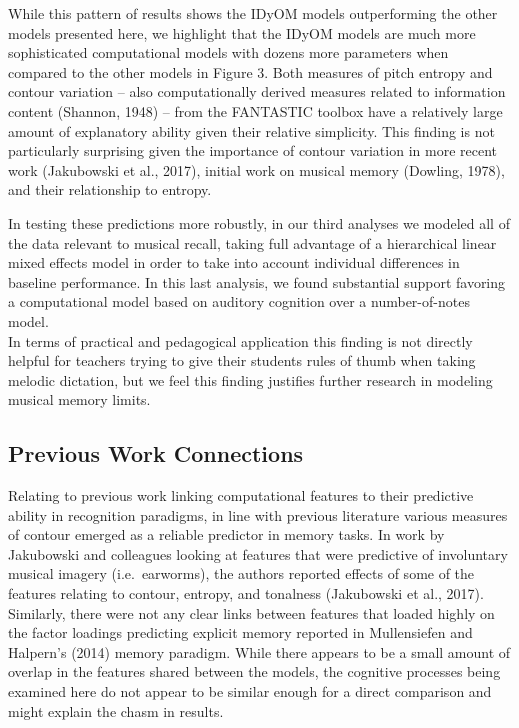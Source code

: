 \documentclass[english,man,floatsintext]{apa6}
\begin{document}
While this pattern of results shows the IDyOM models outperforming the other models presented here, we highlight that the IDyOM models are much more sophisticated computational models with dozens more parameters when compared to the other models in Figure 3.
Both measures of pitch entropy and contour variation -- also computationally derived measures related to information content (Shannon, 1948) -- from the FANTASTIC toolbox have a relatively large amount of explanatory ability given their relative simplicity.
This finding is not particularly surprising given the importance of contour variation in more recent work (Jakubowski et al., 2017), initial work on musical memory (Dowling, 1978), and their relationship to entropy.

In testing these predictions more robustly, in our third analyses we modeled all of the data relevant to musical recall, taking full advantage of a hierarchical linear mixed effects model in order to take into account individual differences in baseline performance.
In this last analysis, we found substantial support favoring a computational model based on auditory cognition over a number-of-notes model.\\
In terms of practical and pedagogical application this finding is not directly helpful for teachers trying to give their students rules of thumb when taking melodic dictation, but we feel this finding justifies further research in modeling musical memory limits.

\hypertarget{previous-work-connections}{%
\subsection{Previous Work Connections}\label{previous-work-connections}}

Relating to previous work linking computational features to their predictive ability in recognition paradigms, in line with previous literature various measures of contour emerged as a reliable predictor in memory tasks.
In work by Jakubowski and colleagues looking at features that were predictive of involuntary musical imagery (i.e.~earworms), the authors reported effects of some of the features relating to contour, entropy, and tonalness (Jakubowski et al., 2017).
Similarly, there were not any clear links between features that loaded highly on the factor loadings predicting explicit memory reported in Mullensiefen and Halpern's (2014) memory paradigm.
While there appears to be a small amount of overlap in the features shared between the models, the cognitive processes being examined here do not appear to be similar enough for a direct comparison and might explain the chasm in results.
\end{document}

